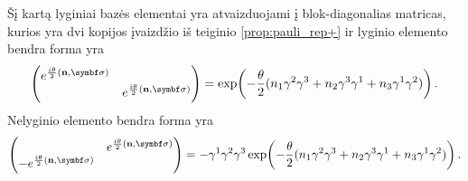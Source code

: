 Šį kartą lyginiai bazės elementai yra atvaizduojami į blok-diagonalias matricas,
kurios yra dvi kopijos įvaizdžio iš teiginio \ref{prop:pauli_rep+} 
ir lyginio elemento bendra forma yra
\begin{equation}
		\mqty(\dmat{
			e^{\frac{i\theta}{2}(\vb n , \symbf\sigma)},
			e^{\frac{i\theta}{2}(\vb n , \symbf\sigma)}
		})
		=
		\exp(-\frac{\theta}{2}(
			 n_1\gamma^2\gamma^3
			+n_2\gamma^3\gamma^1
			+n_3\gamma^1\gamma^2
		))
		\,.
\end{equation}
Nelyginio elemento bendra forma yra
\begin{equation}
		\mqty(\admat{
			 e^{\frac{i\theta}{2}(\vb n , \symbf\sigma)},
			-e^{\frac{i\theta}{2}(\vb n , \symbf\sigma)}
		})
		=
		-\gamma^1\gamma^2\gamma^3 \exp(-\frac{\theta}{2}(
			 n_1\gamma^2\gamma^3
			+n_2\gamma^3\gamma^1
			+n_3\gamma^1\gamma^2
		))
		\,.
\end{equation}






